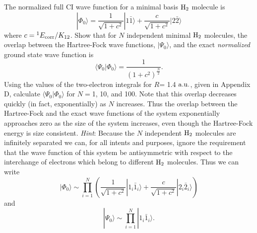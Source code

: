 \documentclass[a4paper]{book}
\newcommand{\au}{{\rm a.u.}}
\begin{document}
	\begin{exercise}
	The normalized full CI wave function for a minimal basis $\ce{H2}$ molecule is
	\[
		| \Phi_0 \rangle = \frac{1}{ \sqrt{1+c^2} } | 1 \bar{1} \rangle + \frac{c}{ \sqrt{1+c^2} } | 2 \bar{2} \rangle
	\]
	where $c = {}^{1}E_{\rm corr}/K_{12}$. Show that for $N$ independent minimal $\ce{H2}$ molecules, the overlap between the Hartree-Fock wave functions, $| \Psi_0 \rangle$, and the exact {\it normalized} ground state wave function is
	\[
		\langle \Psi_0 | \Phi_0 \rangle = \frac{1}{ (1+c^2)^{\frac{N}{2}} }.
	\]
	Using the values of the two-electron integrals for $R$= 1.4 $\au$, given in Appendix D, calculate $\langle \Psi_0 | \Phi_0 \rangle$ for $N=$1, 10, and 100. Note that this overlap decreases quickly (in fact, exponentially) as $N$ increases. Thus the overlap between the Hartree-Fock and the exact wave functions of the system exponentially approaches zero as the size of the system increases, even though the Hartree-Fock energy is size consistent. {\it Hint}: Because the $N$ independent $\ce{H2}$ molecules are infinitely separated we can, for all intents and purposes, ignore the requirement that the wave function of this system be antisymmetric with respect to the interchange of electrons which belong to different $\ce{H2}$ molecules. Thus we can write
	\[
		| \Phi_0 \rangle \sim \prod_{i=1}^N \left( \frac{1}{ \sqrt{ 1 + c^2 } } | 1_i \bar{1}_i \rangle + \frac{c}{ \sqrt{ 1 + c^2 } } | 2_i \bar{2}_i \rangle \right)
	\]
	and
	\[
		| \Psi_0 \rangle \sim \prod_{i=1}^N | 1_i \bar{1}_i \rangle.
	\]
	\end{exercise}
	
\end{document}
